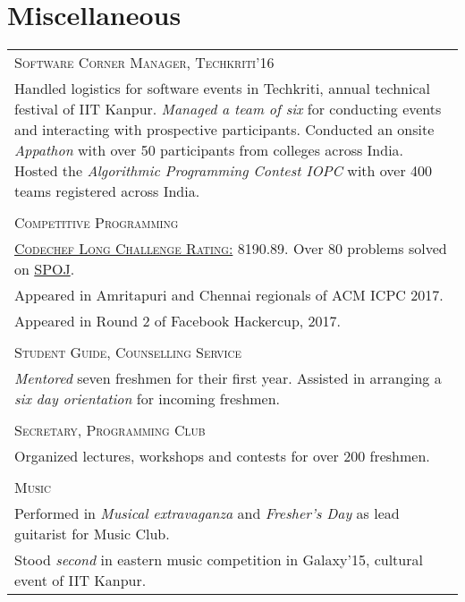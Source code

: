 \documentclass[a4paper,10pt]{article}
\begin{document}
\section{Miscellaneous}
\begin{longtable}{p{17cm}}
\large \textsc{Software Corner Manager, Techkriti'16}\\
Handled logistics for software events in Techkriti, annual technical festival of IIT Kanpur. \textit{Managed a team of six} for conducting events and interacting with prospective participants. Conducted an onsite \textit{Appathon} with over 50 participants from colleges across India. Hosted the \textit{Algorithmic Programming Contest IOPC} with over 400 teams registered across India.\\ \\
\large \textsc{Competitive Programming}\\
\href{https://www.codechef.com/users/architsh}{\textsc{Codechef Long Challenge Rating:}} 8190.89. Over 80 problems solved on \href{http://www.spoj.com/users/architsh/}{SPOJ}.\\
Appeared in Amritapuri and Chennai regionals of ACM ICPC 2017.\\ 
Appeared in Round 2 of Facebook Hackercup, 2017.\\ \\
\large \textsc{Student Guide, Counselling Service}\\
\textit{Mentored} seven freshmen for their first year. Assisted in arranging a \textit{six day orientation} for incoming freshmen.\\ \\
\large \textsc{Secretary, Programming Club}\\
Organized lectures, workshops and contests for over 200 freshmen.
\\ \\
\large \textsc{Music}\\
Performed in \textit{Musical extravaganza} and \textit{Fresher's Day} as lead guitarist for Music Club.\\
Stood \textit{second} in eastern music competition in Galaxy'15, cultural event of IIT Kanpur.
\end{longtable}
\end{document}
